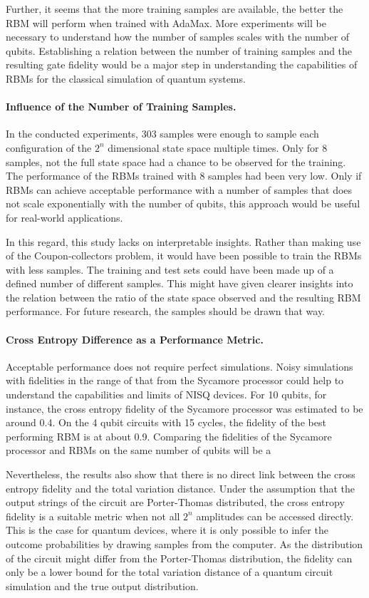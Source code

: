 Further, it seems that the more training samples are available, the better the RBM will 
perform when trained with AdaMax. More experiments will be necessary 
to understand how the number of samples scales with the number of qubits. Establishing
a relation between the number of training samples and the resulting gate fidelity would 
be a major step in understanding the capabilities of RBMs for the classical simulation of 
quantum systems.

\paragraph{Influence of the Number of Training Samples.}
In the conducted experiments, 303 samples were enough to sample each configuration of the 
$2^n$ dimensional state space multiple times. Only for 8  samples, not the full state space
had a chance to be observed for the training. The performance of the RBMs trained with 8 samples
had been very low. Only if RBMs can achieve acceptable performance with a number of samples 
that does not scale exponentially with the number of qubits, this approach would be useful for 
real-world applications. 

In this regard, this study lacks on interpretable insights. Rather than making use of the 
Coupon-collectors problem, it would have been possible to train the RBMs with less samples. 
The training and test sets could have been made up of a defined number of different 
samples. This might have given clearer insights into the relation between the ratio of the 
state space observed and the resulting RBM performance. For future research, the samples should
be drawn that way.

\paragraph{Cross Entropy Difference as a Performance Metric.}
Acceptable performance does not require perfect simulations. Noisy simulations with 
fidelities in the range of that from the Sycamore processor could help to understand the 
capabilities and limits of NISQ devices. For 10 qubits, for instance, the cross entropy fidelity
of the Sycamore processor was estimated to be around 0.4. On the 4 qubit circuits with 
15 cycles, the fidelity of the best performing RBM is at about 0.9. Comparing the fidelities 
of the Sycamore processor and RBMs on the same number of qubits will be a 

Nevertheless, the results also show that there is no direct link between the cross entropy
fidelity and the total variation distance. Under the assumption that the output strings of 
the circuit are Porter-Thomas distributed, the cross entropy fidelity is a suitable metric
when not all $2^n$ amplitudes can be accessed directly. This is the case for quantum devices, 
where it is only possible to infer the outcome probabilities by drawing samples from the computer.
As the distribution of the circuit might differ from the Porter-Thomas distribution, 
the fidelity can only be a lower bound for the total variation distance of a quantum circuit simulation
and the true output distribution.

